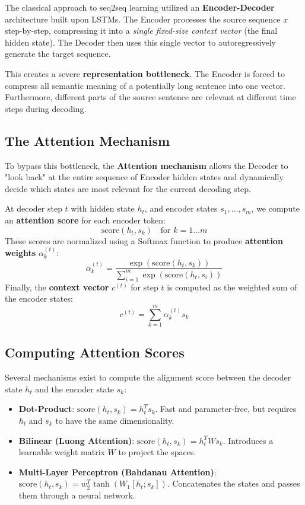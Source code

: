 The classical approach to seq2seq learning utilized an \textbf{Encoder-Decoder} architecture built upon LSTMs. The Encoder processes the source sequence $x$ step-by-step, compressing it into a \textit{single fixed-size context vector} (the final hidden state). The Decoder then uses this single vector to autoregressively generate the target sequence.

This creates a severe \textbf{representation bottleneck}. The Encoder is forced to compress all semantic meaning of a potentially long sentence into one vector. Furthermore, different parts of the source sentence are relevant at different time steps during decoding.

\subsection{The Attention Mechanism}
To bypass this bottleneck, the \textbf{Attention mechanism} allows the Decoder to "look back" at the entire sequence of Encoder hidden states and dynamically decide which states are most relevant for the current decoding step.

At decoder step $t$ with hidden state $h_t$, and encoder states $s_1, \dots, s_m$, we compute an \textbf{attention score} for each encoder token:
\begin{equation}
    \text{score}(h_t, s_k) \quad \text{for } k = 1 \dots m
\end{equation}
These scores are normalized using a Softmax function to produce \textbf{attention weights} $\alpha_k^{(t)}$:
\begin{equation}
    \alpha_k^{(t)} = \frac{\exp(\text{score}(h_t, s_k))}{\sum_{i=1}^m \exp(\text{score}(h_t, s_i))}
\end{equation}
Finally, the \textbf{context vector} $c^{(t)}$ for step $t$ is computed as the weighted sum of the encoder states:
\begin{equation}
    c^{(t)} = \sum_{k=1}^m \alpha_k^{(t)} s_k
\end{equation}

\subsection{Computing Attention Scores}
Several mechanisms exist to compute the alignment score between the decoder state $h_t$ and the encoder state $s_k$:
\begin{itemize}
    \item \textbf{Dot-Product}: $\text{score}(h_t, s_k) = h_t^T s_k$. Fast and parameter-free, but requires $h_t$ and $s_k$ to have the same dimensionality.
    \item \textbf{Bilinear (Luong Attention)}: $\text{score}(h_t, s_k) = h_t^T W s_k$. Introduces a learnable weight matrix $W$ to project the spaces.
    \item \textbf{Multi-Layer Perceptron (Bahdanau Attention)}: $\text{score}(h_t, s_k) = w_2^T \tanh(W_1 [h_t ; s_k])$. Concatenates the states and passes them through a neural network.
\end{itemize}


